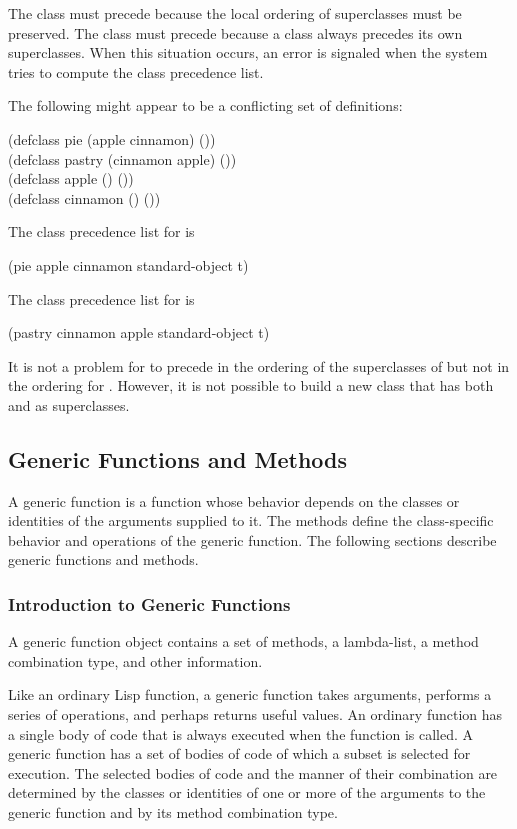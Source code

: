 The class  must precede  because the local
ordering of superclasses must be preserved.  The class  must
precede  because a class always precedes its own
superclasses.  When this situation occurs, an error is signaled when
the system tries to compute the class precedence list.

The following might appear to be a conflicting set of definitions:

\begin{lisp}
(defclass pie (apple cinnamon) ()) \\
(defclass pastry (cinnamon apple) ()) \\
(defclass apple () ()) \\
(defclass cinnamon () ())
\end{lisp}

The class precedence list for  is
\begin{lisp}
(pie apple cinnamon standard-object t)
\end{lisp}

The class precedence list for  is
\begin{lisp}
(pastry cinnamon apple standard-object t)
\end{lisp}

It is not a problem for  to precede  in the
ordering of the superclasses of  but not in the ordering for
.  However, it is not possible to build a new class that
has both  and  as superclasses.


\subsection{Generic Functions and Methods}

A {\bit generic function\/} is a function whose behavior depends on
the classes or identities of the arguments supplied to it.  The {\bit
methods} define the class-specific behavior and operations of the
generic function. The following sections describe generic functions
and methods.

\subsubsection{Introduction to Generic Functions}

A generic function object contains a set of methods, a
lambda-list, a method combination type, and other information.

Like an ordinary Lisp function, a generic function takes arguments,
performs a series of operations, and perhaps returns useful values.
An ordinary function has a single body of code that is always executed
when the function is called.  A generic function has a set of bodies
of code of which a subset is selected for execution. The selected
bodies of code and the manner of their combination are determined by
the classes or identities of one or more of the arguments to the
generic function and by its method combination type.

